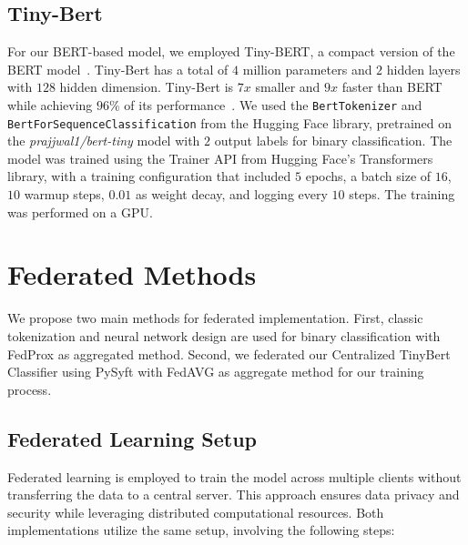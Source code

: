 \documentclass[11pt]{article}
\begin{document}
\subsection{Tiny-Bert}
For our BERT-based model, we employed Tiny-BERT, a compact version of the BERT model~\cite{bhargava2021generalization, DBLP:journals/corr/abs-1908-08962}. Tiny-Bert has a total of $4$ million parameters and $2$ hidden layers with $128$ hidden dimension. Tiny-Bert is $7x$ smaller and $9x$ faster than BERT while achieving $96\%$ of its performance~\cite{jiao2020tinybert}. We used the \texttt{BertTokenizer} and \texttt{BertForSequenceClassification} from the Hugging Face library, pretrained on the \textit{prajjwal1/bert-tiny} model with $2$ output labels for binary classification. The model was trained using the Trainer API from Hugging Face's Transformers library, with a training configuration that included $5$ epochs, a batch size of $16$, $10$ warmup steps, $0.01$ as weight decay, and logging every $10$ steps. The training was performed on a GPU.






\section{Federated Methods}

We propose two main methods for federated implementation. First, classic tokenization and neural network design are used for binary classification with FedProx as aggregated method. Second, we federated our Centralized TinyBert Classifier using PySyft with FedAVG as aggregate method for our training process.


\subsection{Federated Learning Setup}

Federated learning is employed to train the model across multiple clients without transferring the data to a central server. This approach ensures data privacy and security while leveraging distributed computational resources. Both implementations utilize the same setup, involving the following steps:
\end{document}
